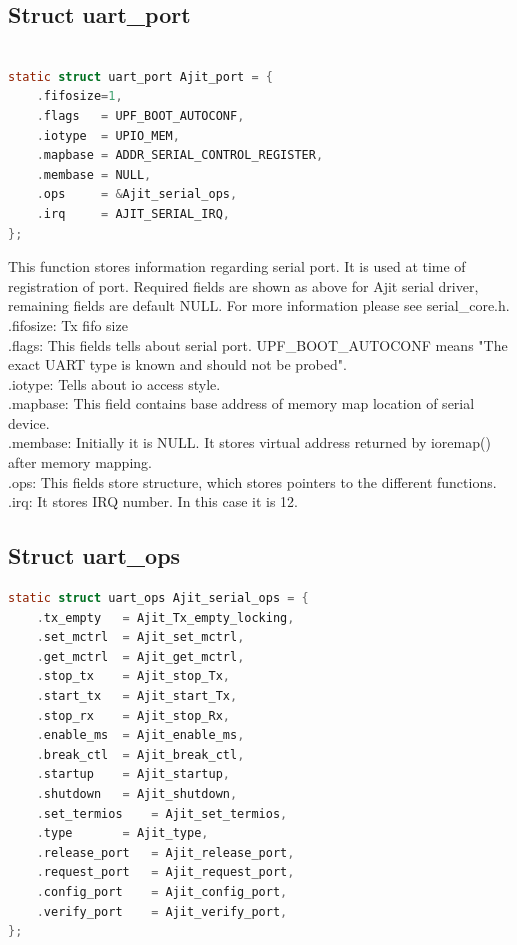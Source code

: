 \documentclass[12pt,a4paper]{article}
\begin{document}
\subsection{Struct uart\_port}
\begin{lstlisting}[backgroundcolor = \color{white},
                   language = C,
                   xleftmargin = 2cm,
                   framexleftmargin = 1em]
                   
static struct uart_port Ajit_port = {
	.fifosize=1,
	.flags   = UPF_BOOT_AUTOCONF,
	.iotype  = UPIO_MEM,
	.mapbase = ADDR_SERIAL_CONTROL_REGISTER,
	.membase = NULL,
	.ops	 = &Ajit_serial_ops,
	.irq	 = AJIT_SERIAL_IRQ,
};
\end{lstlisting}

This function stores information regarding serial port. It is used at time of registration of port. Required fields are shown as above for Ajit serial driver, remaining fields are default NULL. For more information please see serial\_core.h.\\
.fifosize: 	Tx fifo size \\
.flags: This fields tells about serial port. UPF\_BOOT\_AUTOCONF means 
"The exact UART type is known and should not be probed".\\
.iotype: Tells about io access style. \\
.mapbase: This field contains base address of memory map location of serial device.\\
.membase: Initially it is NULL. It stores virtual address returned by ioremap() after memory mapping.\\
.ops: This fields store structure, which stores pointers to the different functions.\\
.irq: It stores IRQ number. In this case it is 12.\\

\subsection{Struct uart\_ops}
\begin{lstlisting}[backgroundcolor = \color{white},
                   language = C,
                   xleftmargin = 2cm,
                   framexleftmargin = 1em]
static struct uart_ops Ajit_serial_ops = {
	.tx_empty	= Ajit_Tx_empty_locking,
	.set_mctrl	= Ajit_set_mctrl,
	.get_mctrl	= Ajit_get_mctrl,
	.stop_tx	= Ajit_stop_Tx,
	.start_tx	= Ajit_start_Tx,
	.stop_rx	= Ajit_stop_Rx,
	.enable_ms	= Ajit_enable_ms,
	.break_ctl	= Ajit_break_ctl,
	.startup	= Ajit_startup,
	.shutdown	= Ajit_shutdown,
	.set_termios	= Ajit_set_termios,
	.type		= Ajit_type,
	.release_port	= Ajit_release_port,
	.request_port	= Ajit_request_port,
	.config_port	= Ajit_config_port,
	.verify_port	= Ajit_verify_port,
};
\end{lstlisting}
\end{document}
